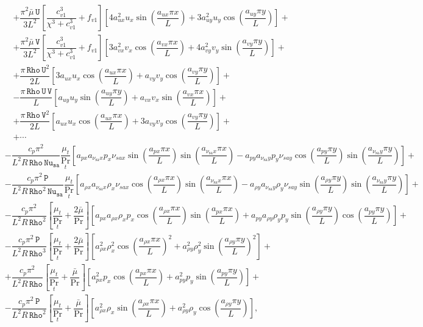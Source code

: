\documentclass[10pt]{article}
\newcommand{\Rho}{\,\mathtt{Rho}}
\newcommand{\PP}{\,\mathtt{P}}
\newcommand{\U}{\,\mathtt{U}}
\newcommand{\V}{\,\mathtt{V}}
\newcommand{\Nu}{\,\mathtt{Nu_{sa}}}
\newcommand{\sa}{\nu_{\mathrm{sa}}}
\newcommand{\bmu}{\bar{\mu}}
\begin{document}
\begin{equation*}
\begin{split}
&+ \dfrac{ \pi^2 \bmu \U}{3L^2}\left[\dfrac{c_{v1}^3 }{ \chi^3+c_{v1}^3} +f_{v1}\right] \left[4 a_{ux}^2 u_x \sin\left(\dfrac{a_{ux} \pi x}{L}\right)+3 a_{uy}^2 u_y \cos\left(\dfrac{a_{uy} \pi y}{L}\right)\right]+\\
&+ \dfrac{\pi^2 \bmu \V}{3L^2}\left[\dfrac{c_{v1}^3 }{ \chi^3+c_{v1}^3} +f_{v1}\right] \left[3 a_{vx}^2 v_x \cos\left(\dfrac{a_{vx} \pi x}{L}\right)+4 a_{vy}^2 v_y \sin\left(\dfrac{a_{vy} \pi y}{L}\right)\right] +\\
&+\dfrac{\pi \Rho \U^2}{2L} \left[3 a_{ux} u_x \cos\left(\dfrac{a_{ux} \pi x}{L}\right)+a_{vy} v_y \cos\left(\dfrac{a_{vy} \pi y}{L}\right)\right] +\\
&-\dfrac{\pi \Rho \U \V}{L}\left[a_{uy} u_y \sin\left(\dfrac{a_{uy} \pi y}{L}\right)+a_{vx} v_x \sin\left(\dfrac{a_{vx} \pi x}{L}\right)\right] +\\
&+\dfrac{ \pi \Rho \V^2}{2L} \left[a_{ux} u_x \cos\left(\dfrac{a_{ux} \pi x}{L}\right)+3 a_{vy} v_y \cos\left(\dfrac{a_{vy} \pi y}{L}\right)\right]+\\
&+\cdots
 \end{split}
\end{equation*}
\begin{equation}\label{eq:ns_2d_e}
\begin{split}
&- \dfrac{c_p \pi^2}{L^2 R \Rho \Nu}\dfrac{\mu_t}{\Pr_t}\left[a_{px} a_{\sa x} p_x \nu_{sa x} \sin\left(\dfrac{a_{px} \pi x}{L}\right) \sin\left(\dfrac{a_{\sa x} \pi x}{L}\right)-a_{py} a_{\sa y} p_y \nu_{sa y} \cos\left(\dfrac{a_{py} \pi y}{L}\right) \sin\left(\dfrac{a_{\sa y} \pi y}{L}\right)\right]+\\
 &- \dfrac{c_p \pi^2 \PP}{L^2 R \Rho^2 \Nu}\dfrac{\mu_t}{\Pr_t} \left[a_{\rho x} a_{\sa x} \rho_x \nu_{sa x} \cos\left(\dfrac{a_{\rho x} \pi x}{L}\right) \sin\left(\dfrac{a_{\sa x} \pi x}{L}\right)-a_{\rho y} a_{\sa y} \rho_y \nu_{sa y} \sin\left(\dfrac{a_{\rho y} \pi y}{L}\right) \sin\left(\dfrac{a_{\sa y} \pi y}{L}\right)\right] +\\
 &-\dfrac{c_p \pi^2}{ L^2 R \Rho^2}\left[\dfrac{\mu_t}{\Pr_t}+\dfrac{2\bmu}{\Pr}\right]\left[a_{px} a_{\rho x} \rho_x p_x \cos\left(\dfrac{a_{\rho x} \pi x}{L}\right) \sin\left(\dfrac{a_{px} \pi x}{L}\right)+a_{py} a_{\rho y} \rho_y p_y \sin\left(\dfrac{a_{\rho y} \pi y}{L}\right) \cos\left(\dfrac{a_{py} \pi y}{L}\right)\right] +\\
 &-\dfrac{c_p \pi^2 \PP}{ L^2 R \Rho^3}\left[\dfrac{\mu_t}{\Pr_t}+\dfrac{2\bmu}{\Pr}\right]\left[a_{\rho x}^2 \rho_x^2 \cos\left(\dfrac{a_{\rho x} \pi x}{L}\right)^2+a_{\rho y}^2 \rho_y^2 \sin\left(\dfrac{a_{\rho y} \pi y}{L}\right)^2\right] +\\
 &+\dfrac{c_p \pi^2}{L^2 R \Rho}\left[\dfrac{\mu_t}{\Pr_t}+\dfrac{\bmu}{\Pr}\right] \left[a_{px}^2 p_x \cos\left(\dfrac{a_{px} \pi x}{L}\right)+a_{py}^2 p_y \sin\left(\dfrac{a_{py} \pi y}{L}\right)\right] +\\
%
&-\dfrac{c_p \pi^2 \PP}{L^2 R \Rho^2}\left[\dfrac{\mu_t}{\Pr_t}+\dfrac{\bmu}{\Pr}\right] \left[a_{\rho x}^2 \rho_x \sin\left(\dfrac{a_{\rho x} \pi x}{L}\right)+a_{\rho y}^2 \rho_y \cos\left(\dfrac{a_{\rho y} \pi y}{L}\right)\right],
 \end{split}
\end{equation}
\end{document}
